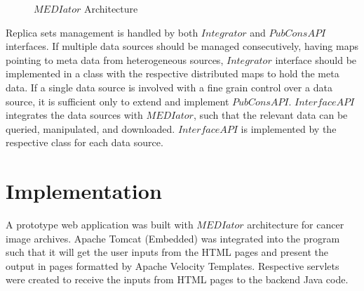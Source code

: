 \documentclass[letterpaper, 10 pt, conference]{ieeeconf}  %
\begin{document}
	\vspace{-13pt}
	\begin{figure}[ht]
		\begin{center}
		\end{center}
		\vspace{-17pt}
		
		\caption{$MEDIator$ Architecture}
		\label{fig:arch}
		\vspace{-13pt}
		
	\end{figure}
	
Replica sets management is handled by both $Integrator$ and $PubConsAPI$ interfaces. If multiple data sources should be managed consecutively, having maps pointing to meta data from heterogeneous sources, $Integrator$ interface should be implemented in a class with the respective distributed maps to hold the meta data. If a single data source is involved with a fine grain control over a data source, it is sufficient only to extend and implement $PubConsAPI$. $InterfaceAPI$ integrates the data sources with $MEDIator$, such that the relevant data can be queried, manipulated, and downloaded. $InterfaceAPI$ is implemented by the respective class for each data source.


\section{Implementation}
A prototype web application was built with $MEDIator$ architecture for cancer image archives. Apache Tomcat (Embedded) was integrated into the program such that it will get the user inputs from the HTML pages and present the output in pages formatted by Apache Velocity Templates. Respective servlets were created to receive the inputs from HTML pages to the backend Java code.
\end{document}
